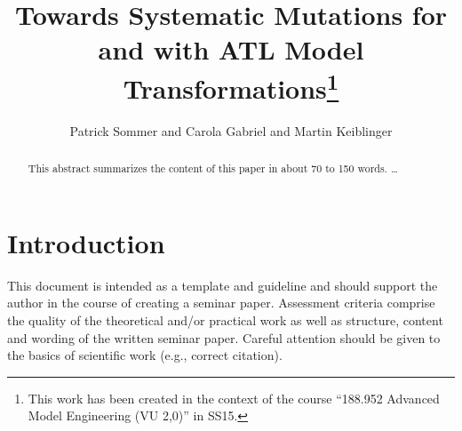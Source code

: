 \documentclass{llncs}
\begin{document}
\pagestyle{plain}

\title{Towards Systematic Mutations for and with ATL Model Transformations\footnote{This work has been created in the context of the course ``188.952 Advanced Model Engineering (VU 2,0)'' in SS15.}}


\author{Patrick Sommer and Carola Gabriel and Martin Keiblinger}


\maketitle

\begin{abstract}

This abstract summarizes the content of this paper in about 70 to 150 words. \dots
\end{abstract}

\tableofcontents
\newpage


\section{Introduction}

This document is intended as a template and guideline and should support the author in the course of creating a seminar paper. Assessment criteria comprise the quality of the theoretical and/or practical work as well as structure, content and wording of the written seminar paper. Careful attention should be given to the basics of scientific work (e.g., correct citation).
\end{document}
